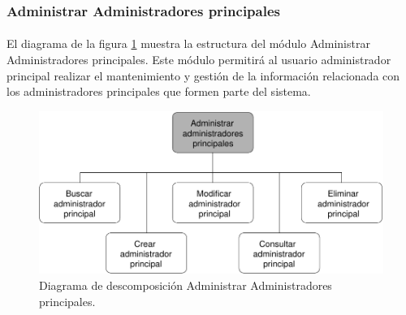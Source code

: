 \subsubsection{Administrar Administradores principales}

  \paragraph{}El diagrama de la figura
  \ref{diagramaDescomposicionAdministrarAdministradoresPrincipales} muestra la
  estructura del módulo Administrar Administradores principales. Este módulo
  permitirá al usuario administrador principal realizar el mantenimiento y
  gestión de la información relacionada con los administradores principales que
  formen parte del sistema.


  \begin{figure}[!ht]
    \begin{center}
      \includegraphics[]{11.Disenyo_Arquitectonico/11.2.Diagramas_Descomposicion/11.2.2.Modulo_administrador_principal/AdministrarBBDD/AdministrarUsuarios/AdministrarAdministradoresPrincipales/Diagramas/administrar_administradores_principales.pdf}
      \caption{Diagrama de descomposición Administrar Administradores principales.}
      \label{diagramaDescomposicionAdministrarAdministradoresPrincipales}
    \end{center}
  \end{figure}
